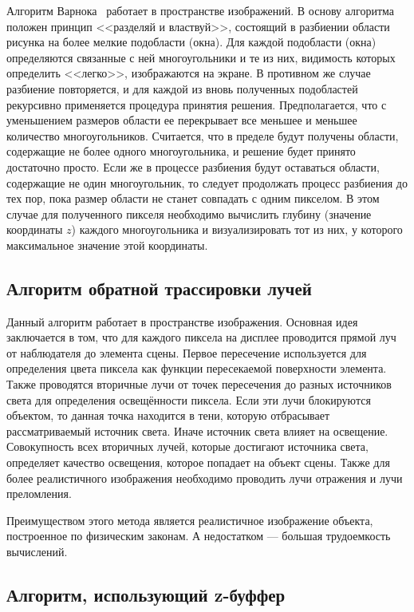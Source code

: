 Алгоритм Варнока~\cite{math_cg} работает в пространстве изображений. В основу алгоритма положен принцип <<разделяй и властвуй>>, состоящий в разбиении области рисунка на более мелкие подобласти (окна). Для каждой подобласти (окна) определяются связанные с ней многоугольники и те из них, видимость которых определить <<легко>>, изображаются на экране. В противном же случае разбиение повторяется, и для каждой из вновь полученных подобластей рекурсивно применяется процедура принятия решения. Предполагается, что с уменьшением размеров области ее перекрывает все меньшее и меньшее количество многоугольников. Считается, что в пределе будут получены области, содержащие не более одного многоугольника, и решение будет принято достаточно просто. Если же в процессе разбиения будут оставаться области, содержащие не один многоугольник, то следует продолжать процесс разбиения до тех пор, пока размер области не станет совпадать с одним пикселом. В этом случае для полученного пикселя необходимо вычислить глубину (значение координаты $z$) каждого многоугольника и визуализировать тот из них, у которого максимальное значение этой координаты.

\subsection{Алгоритм обратной трассировки лучей}

Данный алгоритм работает в пространстве изображения. Основная идея заключается в том, что для каждого пиксела на дисплее проводится прямой луч от наблюдателя до элемента сцены. Первое пересечение используется для определения цвета пиксела как функции пересекаемой поверхности элемента. Также проводятся вторичные лучи от точек пересечения до разных источников света для определения освещённости пиксела. Если эти лучи блокируются объектом, то данная точка находится в тени, которую отбрасывает рассматриваемый источник света. Иначе источник света влияет на освещение. Совокупность всех вторичных лучей, которые достигают источника света, определяет качество освещения, которое попадает на объект сцены. Также для более реалистичного изображения необходимо проводить лучи отражения и лучи преломления.

Преимуществом этого метода является реалистичное изображение объекта, построенное по физическим законам. А недостатком --- большая трудоемкость вычислений.

\subsection{Алгоритм, использующий z-буффер}

